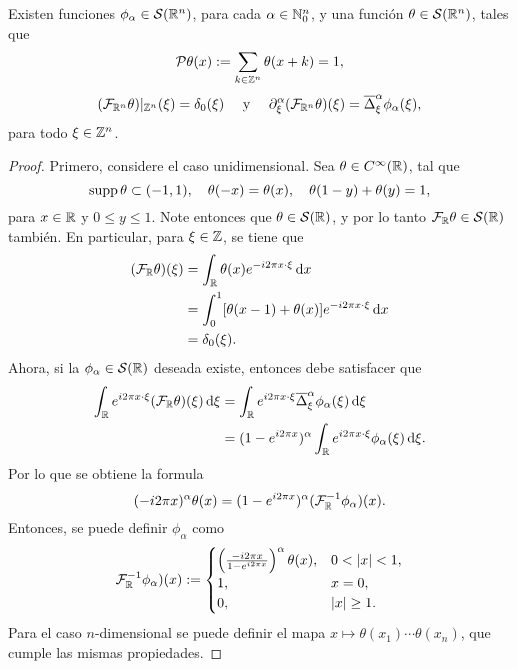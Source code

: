 \begin{lemma}\label{lem:aux-extension}
	Existen funciones $\phi_\alpha\in\mathcal{S}(\mathbb{R}^n)$, para cada $\alpha\in\mathbb{N}_0^n$, y una función $\theta\in\mathcal{S}(\mathbb{R}^n)$, tales que 
	\begin{equation*}
		\mathcal{P}\theta(x) := \sum_{k\in\mathbb{Z}^n}\theta(x+k) = 1,
	\end{equation*}
	\begin{equation*}
		(\mathcal{F}_{\mathbb{R}^n}\theta)|_{\mathbb{Z}^n}(\xi) = \delta_0(\xi) \quad \text{ y } \quad \partial^\alpha_\xi (\mathcal{F}_{\mathbb{R}^n}\theta)(\xi) = \overline{\Delta}^\alpha_\xi \phi_\alpha(\xi),
	\end{equation*}
	para todo $\xi\in\mathbb{Z}^n$.
\end{lemma}
\begin{proof}
	Primero, considere el caso unidimensional. Sea $\theta\in C^\infty(\mathbb{R})$, tal que 
	\begin{equation*}
		\operatorname{supp}\theta \subset (-1, 1), \quad \theta(-x) = \theta(x), \quad \theta(1-y) + \theta(y) = 1,
	\end{equation*}
	para $x\in\mathbb{R}$ y $0\leq y\leq1$. Note entonces que $\theta\in\mathcal{S}(\mathbb{R})$, y por lo tanto $\mathcal{F}_{\mathbb{R}}\theta\in\mathcal{S}(\mathbb{R})$ también. En particular, para $\xi\in\mathbb{Z}$, se tiene que
	\begin{align*}
		(\mathcal{F}_{\mathbb{R}}\theta)(\xi) & = \int_{\mathbb{R}} \theta(x)e^{-i2\pi x\cdot\xi} \mathop{}\!\mathrm{d} x\\
		& = \int_0^1 [\theta(x-1)+\theta(x)]e^{-i2\pi x\cdot\xi} \mathop{}\!\mathrm{d} x\\
		& = \delta_0(\xi).
	\end{align*}
	Ahora, si la $\phi_\alpha\in\mathcal{S}(\mathbb{R})$ deseada existe, entonces debe satisfacer que 
	\begin{align*}
		\int_{\mathbb{R}} e^{i2\pi x\cdot\xi} (\mathcal{F}_{\mathbb{R}}\theta)(\xi)  \mathop{}\!\mathrm{d} \xi & = 
		\int_{\mathbb{R}} e^{i2\pi x\cdot\xi} \overline{\Delta}^\alpha_\xi \phi_\alpha(\xi) \mathop{}\!\mathrm{d} \xi \\
		& = (1-e^{i2\pi x})^\alpha  \int_{\mathbb{R}} e^{i2\pi x\cdot\xi} 
		\phi_\alpha(\xi) \mathop{}\!\mathrm{d} \xi.
	\end{align*}
	Por lo que se obtiene la formula 
	\begin{equation*}
		(-i2\pi x)^\alpha \theta(x) = (1-e^{i2\pi x})^\alpha (\mathcal{F}_{\mathbb{R}}^{-1}\phi_\alpha)(x).
	\end{equation*}
	Entonces, se puede definir $\phi_\alpha$ como 
	\begin{equation*}
		\mathcal{F}_\R^{-1}\phi_\alpha)(x) := \begin{cases}
			\left(\frac{-i2\pi x}{1-e^{i2\pi x}}\right)^\alpha\theta(x), & 0<|x|<1, \\
			1, & x=0,\\
			0, & |x| \geq 1.
		\end{cases}
	\end{equation*}
	Para el caso $n$-dimensional se puede definir el mapa $x\mapsto \theta(x_1)\cdots\theta(x_n)$, que cumple las mismas propiedades. 
\end{proof}
